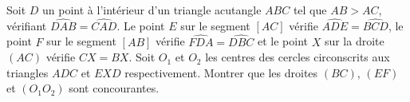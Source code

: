Soit $D$ un point à l'intérieur d'un triangle acutangle $ABC$ tel que $AB > AC$, vérifiant
$\widehat{DAB} = \widehat{CAD}$. Le point $E$ sur le segment $[AC]$ vérifie $\widehat{ADE} = \widehat{BCD}$, le point $F$
sur le segment $[AB]$ vérifie $\widehat{FDA} = \widehat{DBC}$ et le point $X$ sur la droite $(AC)$ vérifie $CX = BX$.
Soit $O_1$ et $O_2$ les centres des cercles circonscrits aux triangles $ADC$ et $EXD$ respectivement.
Montrer que les droites $(BC)$, $(EF)$ et $(O_1O_2)$ sont concourantes.
